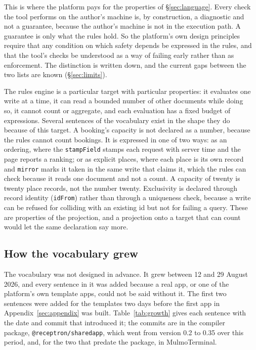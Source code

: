 \documentclass[11pt]{article}
\begin{document}
This is where the platform pays for the properties of \S\ref{sec:language}. Every check the tool performs on the author's machine is, by construction, a diagnostic and not a guarantee, because the author's machine is not in the execution path. A guarantee is only what the rules hold. So the platform's own design principles require that any condition on which safety depends be expressed in the rules, and that the tool's checks be understood as a way of failing early rather than as enforcement. The distinction is written down, and the current gaps between the two lists are known (\S\ref{sec:limits}).

The rules engine is a particular target with particular properties: it evaluates one write at a time, it can read a bounded number of other documents while doing so, it cannot count or aggregate, and each evaluation has a fixed budget of expressions. Several sentences of the vocabulary exist in the shape they do because of this target. A booking's capacity is not declared as a number, because the rules cannot count bookings. It is expressed in one of two ways: as an ordering, where the \texttt{stampField} stamps each request with server time and the page reports a ranking; or as explicit places, where each place is its own record and \texttt{mirror} marks it taken in the same write that claims it, which the rules can check because it reads one document and not a count. A capacity of twenty is twenty place records, not the number twenty. Exclusivity is declared through record identity (\texttt{idFrom}) rather than through a uniqueness check, because a write can be refused for colliding with an existing id but not for failing a query. These are properties of the projection, and a projection onto a target that can count would let the same declaration say more.

\subsection{How the vocabulary grew}
\label{sec:growth}

The vocabulary was not designed in advance. It grew between 12 and 29 August 2026, and every sentence in it was added because a real app, or one of the platform's own template apps, could not be said without it. The first two sentences were added for the templates two days before the first app in Appendix~\ref{sec:appendix} was built. Table~\ref{tab:growth} gives each sentence with the date and commit that introduced it; the commits are in the compiler package, \texttt{@receptron/sharedapp}, which went from version 0.2 to 0.35 over this period, and, for the two that predate the package, in MulmoTerminal.
\end{document}
